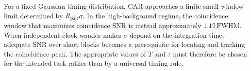 \documentclass[a4paper,10pt]{article}
\begin{document}
For a fixed Gaussian timing distribution, CAR approaches a finite small-window limit determined by $R_{\mathrm{pair}}\sigma$.  In the high-background regime, the coincidence window that maximizes coincidence SNR is instead approximately $1.19\,\mathrm{FWHM}$.  When independent-clock wander makes $\sigma$ depend on the integration time, adequate SNR over short blocks becomes a prerequisite for locating and tracking the coincidence peak.  The appropriate values of $T$ and $\tau$ must therefore be chosen for the intended task rather than by a universal timing rule.
\end{document}
